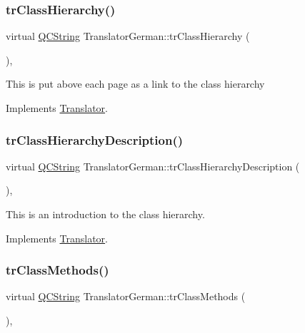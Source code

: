 \subsubsection{\texorpdfstring{trClassHierarchy()}{trClassHierarchy()}}
{\footnotesize\ttfamily virtual \mbox{\hyperlink{class_q_c_string}{Q\+C\+String}} Translator\+German\+::tr\+Class\+Hierarchy (\begin{DoxyParamCaption}{ }\end{DoxyParamCaption})\hspace{0.3cm}{\ttfamily [inline]}, {\ttfamily [virtual]}}

This is put above each page as a link to the class hierarchy 

Implements \mbox{\hyperlink{class_translator}{Translator}}.

\mbox{\label{class_translator_german_a049b7cf1b56e475ece1a58e3e3470341}} 
\subsubsection{\texorpdfstring{trClassHierarchyDescription()}{trClassHierarchyDescription()}}
{\footnotesize\ttfamily virtual \mbox{\hyperlink{class_q_c_string}{Q\+C\+String}} Translator\+German\+::tr\+Class\+Hierarchy\+Description (\begin{DoxyParamCaption}{ }\end{DoxyParamCaption})\hspace{0.3cm}{\ttfamily [inline]}, {\ttfamily [virtual]}}

This is an introduction to the class hierarchy. 

Implements \mbox{\hyperlink{class_translator}{Translator}}.

\mbox{\label{class_translator_german_af5ee36dafc3d3c45e894a8b6dbab9011}} 
\subsubsection{\texorpdfstring{trClassMethods()}{trClassMethods()}}
{\footnotesize\ttfamily virtual \mbox{\hyperlink{class_q_c_string}{Q\+C\+String}} Translator\+German\+::tr\+Class\+Methods (\begin{DoxyParamCaption}{ }\end{DoxyParamCaption})\hspace{0.3cm}{\ttfamily [inline]}, {\ttfamily [virtual]}}


